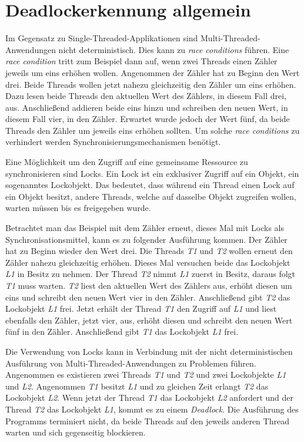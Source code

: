 \section{Deadlockerkennung allgemein}
\label{section:Deadlockerkennung allgemein}
Im Gegensatz zu Single-Threaded-Applikationen sind Multi-Threaded-Anwendungen
nicht deterministisch. Dies kann zu \textit{race conditions} führen. Eine
\textit{race condition} tritt zum Beispiel dann auf, wenn zwei Threads einen
Zähler jeweils um eins erhöhen wollen. Angenommen der Zähler hat zu Beginn den
Wert drei. Beide Threads wollen jetzt nahezu gleichzeitig den Zähler um eins
erhöhen. Dazu lesen beide Threads den aktuellen Wert des Zählers, in diesem Fall
drei, aus. Anschließend addieren beide eins hinzu und schreiben den neuen Wert,
in diesem Fall vier, in den Zähler. Erwartet wurde jedoch der Wert fünf, da
beide Threads den Zähler um jeweils eins erhöhen sollten. Um solche \textit{race
conditions} zu verhindert werden Synchronisierungsmechanismen benötigt.

Eine Möglichkeit um den Zugriff auf eine gemeinsame Ressource zu synchronisieren
sind Locks. Ein Lock ist ein exklusiver Zugriff auf ein Objekt, ein sogenanntes
Lockobjekt. Das bedeutet, dass während ein Thread einen Lock auf ein Objekt
besitzt, andere Threads, welche auf dasselbe Objekt zugreifen wollen, warten
müssen bis es freigegeben wurde.

Betrachtet man das Beispiel mit dem Zähler erneut, dieses Mal mit Locks als
Synchronisationsmittel, kann es zu folgender Ausführung kommen. Der Zähler hat
zu Beginn wieder den Wert drei. Die Threads \textit{T1} und \textit{T2} wollen
erneut den Zähler nahezu gleichzeitig erhöhen. Dieses Mal versuchen beide das
Lockobjekt \textit{L1} in Besitz zu nehmen. Der Thread \textit{T2} nimmt
\textit{L1} zuerst in Besitz, daraus folgt \textit{T1} muss warten. \textit{T2}
liest den aktuellen Wert des Zählers aus, erhöht diesen um eins und schreibt den
neuen Wert vier in den Zähler. Anschließend gibt \textit{T2} das Lockobjekt
\textit{L1} frei. Jetzt erhält der Thread \textit{T1} den Zugriff auf
\textit{L1} und liest ebenfalls den Zähler, jetzt vier, aus, erhöht diesen und
schreibt den neuen Wert fünf in den Zähler. Anschließend gibt \textit{T1} das
Lockobjekt \textit{L1} frei.

Die Verwendung von Locks kann in Verbindung mit der nicht deterministischen Ausführung
von Multi-Threaded-Anwendungen zu Problemen führen.
Angenommen es existieren zwei Threads \textit{T1} und \textit{T2} und zwei
Lockobjekte \textit{L1} und \textit{L2}. Angenommen \textit{T1} besitzt
\textit{L1} und zu gleichen Zeit erlangt \textit{T2} das Lockobjekt \textit{L2}.
Wenn jetzt der Thread \textit{T1} das Lockobjekt \textit{L2} anfordert und der
Thread \textit{T2} das Lockobjekt \textit{L1}, kommt es zu einem
\textit{Deadlock}. Die Ausführung des Programms terminiert nicht, da beide
Threads auf den jeweils anderen Thread warten und sich gegenseitig blockieren.


